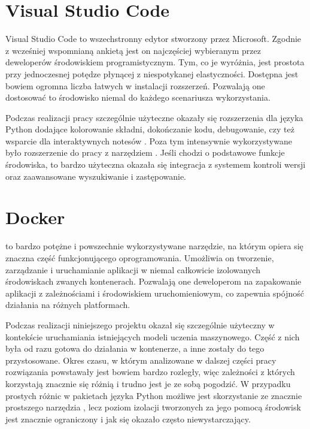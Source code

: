 \section{Visual Studio Code}
Visual Studio Code to wszechstronny edytor stworzony przez Microsoft. Zgodnie z wcześniej wspomnianą ankietą   jest on najczęściej wybieranym przez deweloperów środowiskiem programistycznym. Tym, co je wyróżnia, jest prostota przy jednoczesnej potędze płynącej z niespotykanej elastyczności. Dostępna jest bowiem ogromna liczba łatwych w instalacji rozszerzeń. Pozwalają one dostosować to środowisko niemal do każdego scenariusza wykorzystania.

Podczas realizacji pracy szczególnie użyteczne okazały się rozszerzenia dla języka Python dodające kolorowanie składni, dokończanie kodu, debugowanie, czy też wsparcie dla interaktywnych notesów . Poza tym intensywnie wykorzystywane było rozszerzenie do pracy z narzędziem . Jeśli chodzi o podstawowe funkcje środowiska, to bardzo użyteczna okazała się integracja z systemem kontroli wersji oraz zaawansowane wyszukiwanie i zastępowanie.

\section{Docker}
 to bardzo potężne i powszechnie wykorzystywane narzędzie, na którym opiera się znaczna część funkcjonującego oprogramowania. Umożliwia on tworzenie, zarządzanie i uruchamianie aplikacji w niemal całkowicie izolowanych środowiskach zwanych kontenerach. Pozwalają one deweloperom na zapakowanie aplikacji z zależnościami i środowiskiem uruchomieniowym, co zapewnia spójność działania na różnych platformach.

Podczas realizacji niniejszego projektu  okazał się szczególnie użyteczny w kontekście uruchamiania istniejących modeli uczenia maszynowego. Część z nich była od razu gotowa do działania w kontenerze, a inne zostały do tego przystosowane. Okres czasu, w którym analizowane w dalszej części pracy rozwiązania powstawały jest bowiem bardzo rozległy, więc zależności z których korzystają znacznie się różnią i trudno jest je ze sobą pogodzić. W przypadku prostych różnic w pakietach języka Python możliwe jest skorzystanie ze znacznie prostszego narzędzia , lecz poziom izolacji tworzonych za jego pomocą środowisk jest znacznie ograniczony i jak się okazało często niewystarczający.
